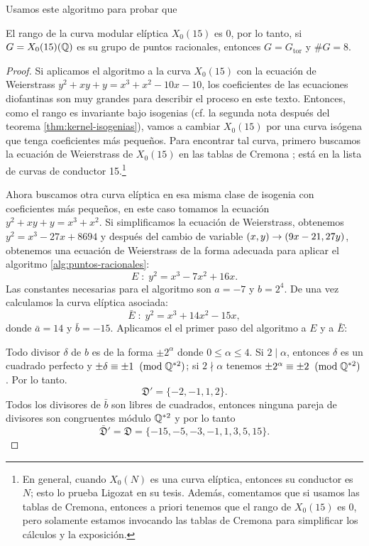 \documentclass[../../tesis_maestria]{subfiles}
\begin{document}
Usamos este algoritmo para probar que

\begin{prop}\label{prop:rango-X015}
  El rango de la curva modular elíptica $X_0(15)$ es 0, por lo tanto, si $G=X_0(15)(\mathbb{Q})$ es su grupo de puntos racionales, entonces $G=G_\mathrm{tor}$ y $\# G=8$.
\end{prop}

\begin{proof}
	Si aplicamos el algoritmo a la curva $X_0(15)$ con la ecuación de Weierstrass $y^2+xy+y=x^3+x^2-10x-10$, los coeficientes de las ecuaciones diofantinas son muy grandes para describir el proceso en este texto. Entonces, como el rango es invariante bajo isogenias (cf. la segunda nota después del teorema \ref{thm:kernel-isogenias}), vamos a cambiar $X_0(15)$ por una curva isógena que tenga coeficientes más pequeños. Para encontrar tal curva, primero buscamos la ecuación de Weierstrass de $X_0(15)$ en las tablas de Cremona \cite{Cremona}; está en la lista de curvas de conductor 15.\footnote{En general, cuando $X_0(N)$ es una curva elíptica, entonces su conductor es $N$; esto lo prueba Ligozat en su tesis. Además, comentamos que si usamos las tablas de Cremona, entonces a priori tenemos que el rango de $X_0(15)$ es 0, pero solamente estamos invocando las tablas de Cremona para simplificar los cálculos y la exposición.}
	
	Ahora buscamos otra curva elíptica en esa misma clase de isogenia con coeficientes más pequeños, en este caso tomamos la ecuación $y^2+xy+y= x^3+x^2$. Si simplificamos la ecuación de Weierstrass, obtenemos $y^2=x^3-27x+8694$ y después del cambio de variable $(x,y)\rightarrow (9x-21,27y)$, obtenemos una ecuación de Weierstrass de la forma adecuada para aplicar el algoritmo \ref{alg:puntos-racionales}:
\[
	E\; : \; y^2=x^3-7x^2+16x.
\]
Las constantes necesarias para el algoritmo son $a=-7$ y $b=2^4$. De una vez calculamos la curva elíptica asociada:
\[
	\bar{E}\; :\; y^2=x^3+14x^2-15x,
\]
donde $\bar{a}=14$ y $\bar{b}=-15$. Aplicamos el el primer paso del algoritmo a $E$ y a $\bar{E}$:

Todo divisor $\delta$ de $b$ es de la forma $\pm 2^\alpha$ donde $0\leq\alpha\leq4$. Si $2\mid\alpha$, entonces $\delta$ es un cuadrado perfecto y $\pm\delta\equiv\pm1\;\;(\mathrm{mod}\; \mathbb{Q}^{*2})$; si $2\nmid\alpha$ tenemos $\pm 2^\alpha\equiv\pm 2\;\;(\mathrm{mod}\; \mathbb{Q}^{*2})$. Por lo tanto.
\[
	\mathfrak{D}'=\{-2,-1,1,2\}.
\]
Todos los divisores de $\bar{b}$ son libres de cuadrados, entonces ninguna pareja de divisores son congruentes módulo $\mathbb{Q}^{*2}$ y por lo tanto
\[
	\bar{\mathfrak{D}}'=\mathfrak{D}=\{-15,-5,-3,-1,1,3,5,15\}.
\]


\end{proof}
\end{document}
